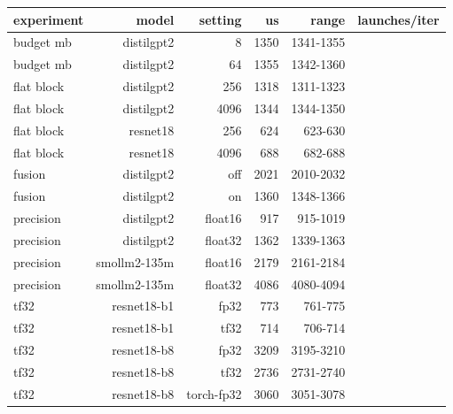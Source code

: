 \begin{tabular}{lrrrrr}
\toprule
experiment & model & setting & us & range & launches/iter \\
\midrule
budget mb & distilgpt2 & 8 & 1350 & 1341-1355 &  \\
budget mb & distilgpt2 & 64 & 1355 & 1342-1360 &  \\
flat block & distilgpt2 & 256 & 1318 & 1311-1323 &  \\
flat block & distilgpt2 & 4096 & 1344 & 1344-1350 &  \\
flat block & resnet18 & 256 & 624 & 623-630 &  \\
flat block & resnet18 & 4096 & 688 & 682-688 &  \\
fusion & distilgpt2 & off & 2021 & 2010-2032 &  \\
fusion & distilgpt2 & on & 1360 & 1348-1366 &  \\
precision & distilgpt2 & float16 & 917 & 915-1019 &  \\
precision & distilgpt2 & float32 & 1362 & 1339-1363 &  \\
precision & smollm2-135m & float16 & 2179 & 2161-2184 &  \\
precision & smollm2-135m & float32 & 4086 & 4080-4094 &  \\
tf32 & resnet18-b1 & fp32 & 773 & 761-775 &  \\
tf32 & resnet18-b1 & tf32 & 714 & 706-714 &  \\
tf32 & resnet18-b8 & fp32 & 3209 & 3195-3210 &  \\
tf32 & resnet18-b8 & tf32 & 2736 & 2731-2740 &  \\
tf32 & resnet18-b8 & torch-fp32 & 3060 & 3051-3078 &  \\
\bottomrule
\end{tabular}
